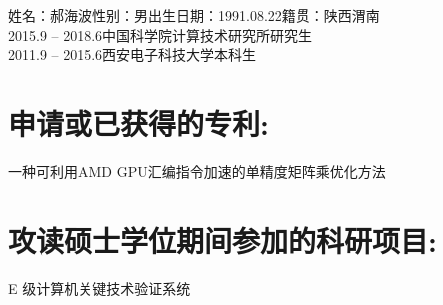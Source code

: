 

%
\begin{flushleft}
	姓名：郝海波\qquad 性别：男\qquad 出生日期：1991.08.22\qquad 籍贯：陕西渭南\\
	\vspace{2ex}
	2015.9 – 2018.6\qquad\qquad 中国科学院计算技术研究所研究生\\
	2011.9 – 2015.6\qquad\qquad 西安电子科技大学本科生
\end{flushleft}

%
%
%
%
\section*{申请或已获得的专利:}

一种可利用AMD GPU汇编指令加速的单精度矩阵乘优化方法
%
%
\section*{攻读硕士学位期间参加的科研项目:}
E 级计算机关键技术验证系统


